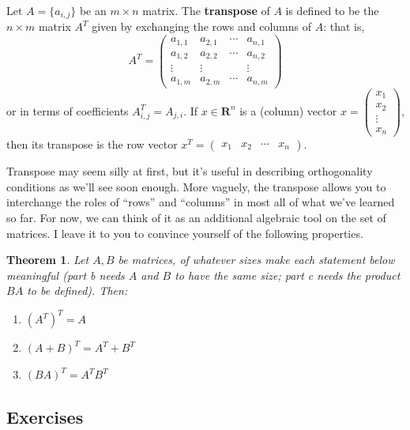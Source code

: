 \documentclass[12pt]{article}
\numberwithin{equation}{subsection}
\numberwithin{figure}{subsection}
\newtheorem{thm}[subsection]{Theorem}
\theoremstyle{note}
\begin{document}
Let $A=\{a_{i,j}\}$ be an $m\times n$ matrix. The \textbf{transpose} of $A$ is defined to be the $n\times m$ matrix $A^T$ given by exchanging the rows and columns of $A$: that is, 
\begin{equation}
A^T=\begin{pmatrix} a_{1,1} & a_{2,1} & \cdots & a_{n,1} \\
a_{1,2} & a_{2,2} & \cdots & a_{n,2} \\
\vdots & \vdots & & \vdots \\
a_{1,m} & a_{2,m} &\cdots & a_{n,m}
\end{pmatrix}
\end{equation}
or in terms of coefficients $A^T_{i,j}=A_{j,i}$. If $x\in\mathbf{R}^n$ is a (column) vector $x=\begin{pmatrix} x_1 \\ x_2 \\ \vdots \\ x_n\end{pmatrix}$, then its transpose is the row vector $x^T=\begin{pmatrix} x_1 & x_2 & \cdots & x_n \end{pmatrix}$.

Transpose may seem silly at first, but it's useful in describing orthogonality conditions as we'll see soon enough. More vaguely, the transpose allows you to interchange the roles of ``rows'' and ``columns'' in most all of what we've learned so far. For now, we can think of it as an additional algebraic tool on the set of matrices. I leave it to you to convince yourself of the following properties.

\begin{thm} \label{thm-transpose}
Let $A,B$ be matrices, of whatever sizes make each statement below meaningful (part b needs $A$ and $B$ to have the same size; part c needs the product $BA$ to be defined). Then: \begin{enumerate}
	\item $(A^T)^T=A$
	\item $(A+B)^T=A^T+B^T$
	\item $(BA)^T=A^TB^T$
\end{enumerate}
\end{thm}

\subsection{Exercises}
\end{document}

